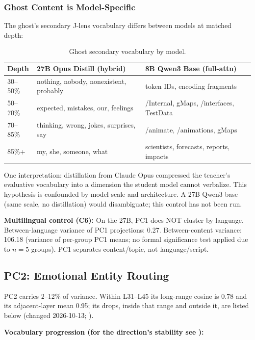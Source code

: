 \documentclass[11pt,a4paper]{article}
\begin{document}
\subsubsection{Ghost Content is Model-Specific}

The ghost's secondary J-lens vocabulary differs between models at matched depth:

\begin{table}[H]
\centering
\caption{Ghost secondary vocabulary by model.}
\label{tab:ghost-content}
\small
\begin{tabular}{lp{5cm}p{5cm}}
\toprule
Depth & 27B Opus Distill (hybrid) & 8B Qwen3 Base (full-attn) \\
\midrule
30--50\% & nothing, nobody, nonexistent, probably & token IDs, encoding fragments \\
50--70\% & expected, mistakes, our, feelings & /Internal, gMaps, /interfaces, TestData \\
70--85\% & thinking, wrong, jokes, surprises, say & /animate, /animations, gMaps \\
85\%+ & my, she, someone, what & scientists, forecasts, reports, impacts \\
\bottomrule
\end{tabular}
\end{table}

One interpretation: distillation from Claude Opus compressed the teacher's evaluative vocabulary into a dimension the student model cannot verbalize. This hypothesis is confounded by model scale and architecture. A 27B Qwen3 base (same scale, no distillation) would disambiguate; this control has not been run.

\textbf{Multilingual control (C6):} On the 27B, PC1 does NOT cluster by language. Between-language variance of PC1 projections: 0.27. Between-content variance: 106.18 (variance of per-group PC1 means; no formal significance test applied due to $n = 5$ groups). PC1 separates content/topic, not language/script.

\subsection{PC2: Emotional Entity Routing}

PC2 carries 2--12\% of variance. Within L31--L45 its long-range cosine is 0.78 and its adjacent-layer mean 0.95; its drops, inside that range and outside it, are listed below  (changed 2026-10-13; ).

\textbf{Vocabulary progression (for the direction's stability see ):}
\end{document}

